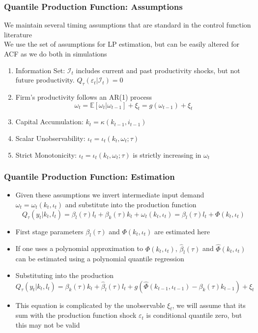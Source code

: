 \documentclass{beamer}
\begin{document}
\begin{frame}
\frametitle{Quantile Production Function: Assumptions}
We maintain several timing assumptions that are standard in the control function literature\\

We use the set of assumptions for LP estimation, but can be easily altered for ACF as we do both in simulations\\

\begin{enumerate}
	\item Information Set: $\mathcal{I}_{t}$ includes current and past productivity shocks, but not future productivity. $Q_{\tau}(\varepsilon_{t}|\mathcal{I}_{t})=0$
	\item Firm's productivity follows an AR(1) process
	\begin{equation}
		\omega_{t}=\mathbb{E}[\omega_{t}|\omega_{t-1}]+\xi_{t}=g(\omega_{t-1})+\xi_{t}
	\end{equation}
	\item Capital Accumulation: $k_{t}=\kappa(k_{t-1}, i_{t-1})$
	\item Scalar Unobservability: $\iota_{t}=\iota_{t}(k_{t}, \omega_{t};\tau)$
	\item Strict Monotonicity: $\iota_{t}=\iota_{t}(k_{t}, \omega_{t};\tau)$ is strictly increasing in $\omega_{t}$
\end{enumerate}
\end{frame}


\begin{frame}
\frametitle{Quantile Production Function: Estimation}
\begin{itemize}
	\item Given these assumptions we invert intermediate input demand $\omega_{t}=\omega_{t}(k_{t}, \iota_{t})$ and substitute into the production function
	\begin{equation}
	Q_{\tau}(y_{t}|k_{t}, l_{t})=\beta_{l}(\tau)l_{t}+\beta_{k}(\tau)k_{t}+\omega_{t}(k_{t}, \iota_{t})=\beta_{l}(\tau)l_{t}+\Phi(k_{t}, \iota_{t})
	\end{equation}
	\item First stage parameters $\beta_{l}(\tau)$ and $\Phi(k_{t}, \iota_{t})$ are estimated here
	\item If one uses a polynomial approximation to $\Phi(k_{t}, \iota_{t})$, $\hat{\beta}_{l}(\tau)$ and $\hat{\Phi}(k_{t}, \iota_{t})$ can be estimated using a polynomial quantile regression
	\item Substituting into the production
	\begin{equation}
	Q_{\tau}(y_{t}|k_{t}, l_{t})=\beta_{k}(\tau)k_{t}+\hat{\beta}_{l}(\tau)l_{t}+g(\hat{\Phi}(k_{t-1}, \iota_{t-1})-\beta_{k}(\tau)k_{t-1})+\xi_{t}
	\end{equation}
	\item This equation is complicated by the unobservable $\xi_{t}$, we will assume that its sum with the production function shock $\varepsilon_{t}$ is conditional quantile zero, but this may not be valid
\end{itemize}
\end{frame}
\end{document}
